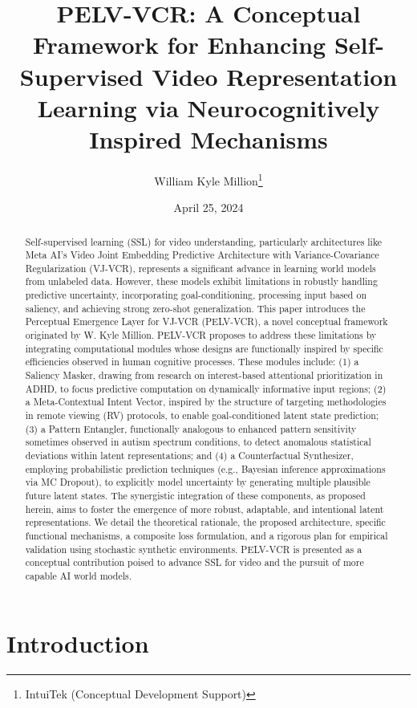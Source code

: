 \documentclass[11pt]{article}
\title{PELV-VCR: A Conceptual Framework for Enhancing Self-Supervised Video Representation Learning via Neurocognitively Inspired Mechanisms}
\author{William Kyle Million\thanks{IntuiTek (Conceptual Development Support)}}
\date{April 25, 2024} %
\begin{document}
\maketitle

\begin{abstract}
Self-supervised learning (SSL) for video understanding, particularly architectures like Meta AI's Video Joint Embedding Predictive Architecture with Variance-Covariance Regularization (VJ-VCR), represents a significant advance in learning world models from unlabeled data. However, these models exhibit limitations in robustly handling predictive uncertainty, incorporating goal-conditioning, processing input based on saliency, and achieving strong zero-shot generalization. This paper introduces the Perceptual Emergence Layer for VJ-VCR (PELV-VCR), a novel conceptual framework originated by W. Kyle Million. PELV-VCR proposes to address these limitations by integrating computational modules whose designs are functionally inspired by specific efficiencies observed in human cognitive processes. These modules include: (1) a Saliency Masker, drawing from research on interest-based attentional prioritization in ADHD, to focus predictive computation on dynamically informative input regions; (2) a Meta-Contextual Intent Vector, inspired by the structure of targeting methodologies in remote viewing (RV) protocols, to enable goal-conditioned latent state prediction; (3) a Pattern Entangler, functionally analogous to enhanced pattern sensitivity sometimes observed in autism spectrum conditions, to detect anomalous statistical deviations within latent representations; and (4) a Counterfactual Synthesizer, employing probabilistic prediction techniques (e.g., Bayesian inference approximations via MC Dropout), to explicitly model uncertainty by generating multiple plausible future latent states. The synergistic integration of these components, as proposed herein, aims to foster the emergence of more robust, adaptable, and intentional latent representations. We detail the theoretical rationale, the proposed architecture, specific functional mechanisms, a composite loss formulation, and a rigorous plan for empirical validation using stochastic synthetic environments. PELV-VCR is presented as a conceptual contribution poised to advance SSL for video and the pursuit of more capable AI world models.
\end{abstract}

\section{Introduction}
\end{document}
